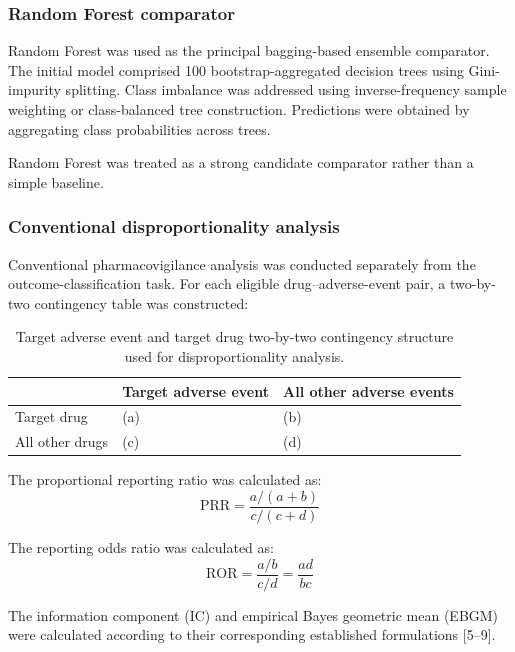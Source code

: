\documentclass[10pt]{article}
\begin{document}
\subsubsection{Random Forest comparator}
Random Forest was used as the principal bagging-based ensemble comparator. The initial model comprised 100 bootstrap-aggregated decision trees using Gini-impurity splitting. Class imbalance was addressed using inverse-frequency sample weighting or class-balanced tree construction. Predictions were obtained by aggregating class probabilities across trees.

Random Forest was treated as a strong candidate comparator rather than a simple baseline.

\subsubsection{Conventional disproportionality analysis}
Conventional pharmacovigilance analysis was conducted separately from the outcome-classification task. For each eligible drug--adverse-event pair, a two-by-two contingency table was constructed:

\begin{table}[H]
\caption{Target adverse event and target drug two-by-two contingency structure used for disproportionality analysis.}
\label{tab:contingency}
\centering
\begin{tabularx}{\textwidth}{|l|>{\raggedright\arraybackslash}X|>{\raggedright\arraybackslash}X|}
\hline
 & \textbf{Target adverse event} & \textbf{All other adverse events} \\
\hline
Target drug & (a) & (b) \\
\hline
All other drugs & (c) & (d) \\
\hline
\end{tabularx}
\end{table}

The proportional reporting ratio was calculated as:
\begin{equation}
\text{PRR} = \frac{a / (a + b)}{c / (c + d)}
\end{equation}

The reporting odds ratio was calculated as:
\begin{equation}
\text{ROR} = \frac{a / b}{c / d} = \frac{ad}{bc}
\end{equation}

The information component (IC) and empirical Bayes geometric mean (EBGM) were calculated according to their corresponding established formulations [5--9].
\end{document}
